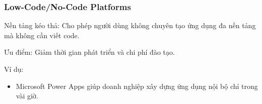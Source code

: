   \subsubsection{Low-Code/No-Code Platforms}
    \begin{flushleft}
      \hspace*{0.8cm}Nền tảng kéo thả: Cho phép người dùng không chuyên tạo ứng dụng đa nền tảng mà không cần viết code.
    \end{flushleft}

    \begin{flushleft}
      \hspace*{0.8cm}Ưu điểm: Giảm thời gian phát triển và chi phí đào tạo.
    \end{flushleft}
    
    \begin{flushleft}
      \hspace*{0.8cm}Ví dụ:
      \setlength{\leftmargini}{1.5cm}
      \begin{itemize}
        \item Microsoft Power Apps giúp doanh nghiệp xây dựng ứng dụng nội bộ chỉ trong vài giờ.
      \end{itemize}
    \end{flushleft}


